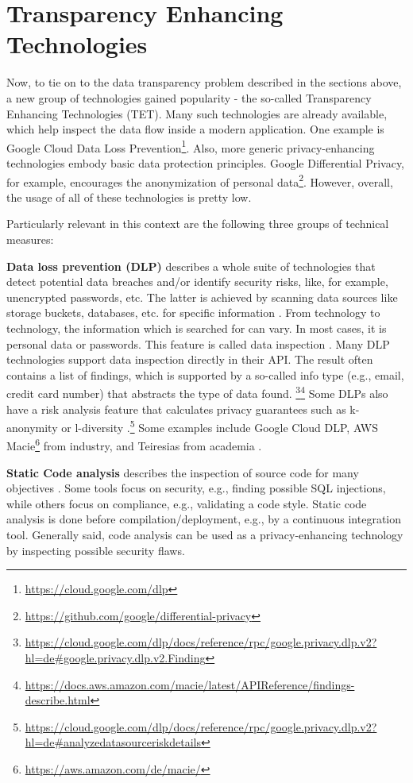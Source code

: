 \section{Transparency Enhancing Technologies}
Now, to tie on to the data transparency problem described in the sections above, a new group of technologies gained popularity - the so-called Transparency Enhancing Technologies (TET). Many such technologies are already available, which help inspect the data flow inside a modern application. One example is Google Cloud Data Loss Prevention\footnote{\url{https://cloud.google.com/dlp}}.
Also, more generic privacy-enhancing technologies embody basic data protection principles. Google Differential Privacy, for example, encourages the anonymization of personal data\footnote{\url{https://github.com/google/differential-privacy}}.
However, overall, the usage of all of these technologies is pretty low.


Particularly relevant in this context are the following three groups of technical measures:


\textbf{Data loss prevention (DLP)} describes a whole suite of technologies that detect potential data breaches and/or identify security risks, like, for example, unencrypted passwords, etc. The latter is achieved by scanning data sources like storage buckets, databases, etc. for specific information \cite{zhang_what_2020}. From technology to technology, the information which is searched for can vary. In most cases, it is personal data or passwords. This feature is called data inspection \cite{kim_sensitive_2020}. Many DLP technologies support data inspection directly in their API. The result often contains a list of findings, which is supported by a so-called info type (e.g., email, credit card number) that abstracts the type of data found. \footnote{\url{https://cloud.google.com/dlp/docs/reference/rpc/google.privacy.dlp.v2?hl=de\#google.privacy.dlp.v2.Finding}}\footnote{\url{https://docs.aws.amazon.com/macie/latest/APIReference/findings-describe.html}} Some DLPs also have a risk analysis feature that calculates privacy guarantees such as k-anonymity \cite{sweeney_k-anonymity_2002} or l-diversity \cite{machanavajjhala_l_2007}.\footnote{\url{https://cloud.google.com/dlp/docs/reference/rpc/google.privacy.dlp.v2?hl=de\#analyzedatasourceriskdetails}} Some examples include Google Cloud DLP, AWS Macie\footnote{\url{https://aws.amazon.com/de/macie/}} from industry, and Teiresias from academia \cite{grunewald_teiresias_2022}.

\textbf{Static Code analysis} describes the inspection of source code for many objectives \cite{novak_taxonomy_2010}. Some tools focus on security, e.g., finding possible SQL injections, while others focus on compliance, e.g., validating a code style. Static code analysis is done before compilation/deployment, e.g., by a continuous integration tool. Generally said, code analysis can be used as a privacy-enhancing technology by inspecting possible security flaws.

